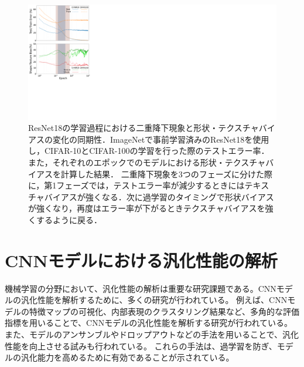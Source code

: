 \begin{figure}[tb]
    \centering
    \includegraphics[width=\linewidth]{fig/iwaseICPR.pdf}
    \caption[ResNet18の学習過程における二重降下現象と形状・テクスチャバイアスの変化の同期性．]{ResNet18の学習過程における二重降下現象と形状・テクスチャバイアスの変化の同期性．ImageNetで事前学習済みのResNet18を使用し，CIFAR-10とCIFAR-100の学習を行った際のテストエラー率．また，それぞれのエポックでのモデルにおける形状・テクスチャバイアスを計算した結果．
    二重降下現象を3つのフェーズに分けた際に，第1フェーズでは，テストエラー率が減少するときにはテキスチャバイアスが強くなる．次に過学習のタイミングで形状バイアスが強くなり，再度はエラー率が下がるときテクスチャバイアスを強くするように戻る．}
    \label{fig:iwaseICPR}
\end{figure}

\section{CNNモデルにおける汎化性能の解析}
機械学習の分野において、汎化性能の解析は重要な研究課題である。CNNモデルの汎化性能を解析するために、多くの研究が行われている。
例えば、CNNモデルの特徴マップの可視化\cite{DBLP:conf/cvpr/ZeilerF14}、内部表現のクラスタリング結果など、多角的な評価指標を用いることで、CNNモデルの汎化性能を解析する研究が行われている。
また、モデルのアンサンブルやドロップアウトなどの手法を用いることで、汎化性能を向上させる試みも行われている\cite{JMLR:v15:srivastava14a}。
これらの手法は、過学習を防ぎ、モデルの汎化能力を高めるために有効であることが示されている。
